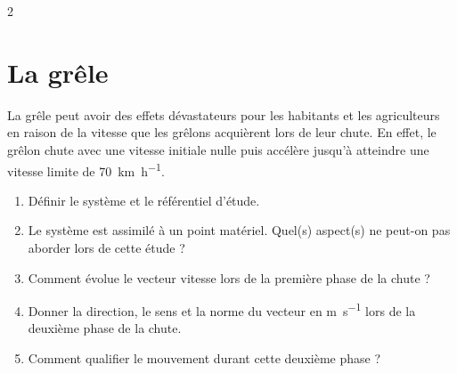 \documentclass[a4paper,11pt,fleqn]{article}%
\begin{document}
\begin{multicols}{2}
\section{La grêle}
La grêle peut avoir des effets dévastateurs pour les habitants et les agriculteurs en raison de la vitesse que les grêlons acquièrent lors de leur chute. En effet, le grêlon chute avec une vitesse initiale nulle puis accélère jusqu'à atteindre une vitesse limite de \SI{70}{\kilo\meter\per\hour}.
\begin{enumerate}
	\item Définir le système et le référentiel d'étude.
	\item Le système est assimilé à un point matériel. Quel(s) aspect(s) ne peut-on pas aborder lors de cette étude ?
	\item Comment évolue le vecteur vitesse lors de la première phase de la chute ?
	\item Donner la direction, le sens et la norme du vecteur en \unit{\meter\per\second} lors de la deuxième phase de la chute.
	\item Comment qualifier le mouvement durant cette deuxième phase ?
\end{enumerate}
\end{multicols}
\end{document}
